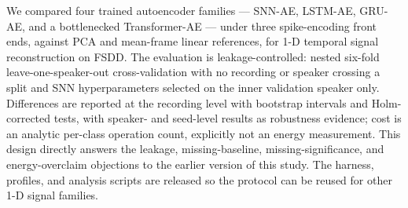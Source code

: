 \documentclass[conference]{IEEEtran}
\begin{document}
\par We compared four trained autoencoder families --- SNN-AE, LSTM-AE, GRU-AE,
and a bottlenecked Transformer-AE --- under three spike-encoding front ends,
against PCA and mean-frame linear references, for 1-D temporal signal
reconstruction on FSDD. The evaluation is leakage-controlled: nested six-fold
leave-one-speaker-out cross-validation with no recording or speaker crossing a
split and SNN hyperparameters selected on the inner validation speaker only.
Differences are reported at the recording level with bootstrap intervals and
Holm-corrected tests, with speaker- and seed-level results as robustness
evidence; cost is an analytic per-class operation count, explicitly not an
energy measurement. This design directly answers the leakage, missing-baseline,
missing-significance, and energy-overclaim objections to the earlier version of
this study. The harness, profiles, and analysis scripts are released so the
protocol can be reused for other 1-D signal families.



\end{document}
